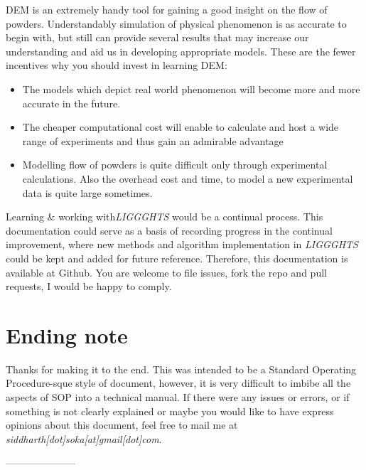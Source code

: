 \documentclass{tufte-book} %
\newcommand{\Li}{\textit{LIGGGHTS}\xspace}
\begin{document}
DEM is an extremely handy tool for gaining a good insight on the flow of powders. Understandably simulation of physical phenomenon is as accurate to begin with, but still can provide several results that may increase our understanding and aid us in developing appropriate models. These are the fewer incentives why you should invest in learning DEM:
\begin{itemize}
\item The models which depict real world phenomenon will become more and more accurate in the future. 
\item The cheaper computational cost will enable to calculate and host a wide range of experiments and thus gain an admirable advantage
\item Modelling flow of powders is quite difficult only through experimental calculations. Also the overhead cost and time, to model a new experimental data is quite large sometimes. 
\end{itemize}

Learning \& working with\Li would be a continual process. This documentation could serve as a basis of recording progress in the continual improvement, where new methods and algorithm implementation in \Li could be kept and added for future reference. Therefore, this documentation is available at Github. You are welcome to file issues, fork the repo and pull requests, I would be happy to comply. 

\section{Ending note}

Thanks for making it to the end. This was intended to be a Standard Operating Procedure-sque style of document, however, it is very difficult to imbibe all the aspects of SOP into a technical manual. If there were any issues or errors, or if something is not clearly explained or maybe you would like to have express opinions about this document, feel free to mail me at \textit{siddharth[dot]soka[at]gmail[dot]com}.



 ---------------------



\printindex %
\end{document}
